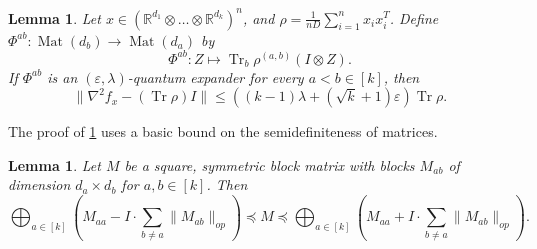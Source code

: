 \documentclass[aos]{imsart}
\newtheorem{lemma}[theorem]{Lemma}
\theoremstyle{definition}
\numberwithin{equation}{section}
\DeclareMathOperator{\mat}{Mat}
\DeclareMathOperator{\tr}{Tr}
\newcommand{\R}{{\mathbb{R}}}
\newcommand{\ot}{\otimes}
\newcommand{\eps}{\varepsilon}
\newcommand{\samp}{x}
\begin{document}
\begin{lemma}\label{lem:expansion-convexity} Let $\samp \in (\R^{d_1} \ot \dots \ot \R^{d_k})^n$, and $\rho = \frac{1}{nD} \sum_{i = 1}^n \samp_i \samp_i^T$. Define $\Phi^{ab}:\mat (d_b) \to \mat(d_a)$ by 
$$ \Phi^{ab}: Z \mapsto \tr_b \rho^{(a,b)} \left(I \ot Z\right).$$
If $\Phi^{ab}$ is an $(\eps, \lambda)$-quantum expander for every $a < b \in [k]$, then 
$$ \|\nabla^2 f_\samp - (\tr \rho) I\| \leq ((k-1)\lambda + (\sqrt{k} + 1) \eps)\tr \rho.$$
\end{lemma}
The proof of \cref{lem:expansion-convexity} uses a basic bound on the semidefiniteness of matrices.
\begin{lemma}\label{lem:block-matrix}
Let $M$ be a square, symmetric block matrix with blocks $M_{ab}$ of dimension $d_a \times d_b$ for $a,b \in [k]$. Then 
$$ \bigoplus_{a \in [k]} \left(M_{aa} - I \cdot \sum_{b \neq a} \|M_{ab}\|_{op}\right) \preceq M \preceq \bigoplus_{a \in [k]} \left(M_{aa} + I \cdot \sum_{b \neq a} \|M_{ab}\|_{op}\right) .$$
\end{lemma}
\end{document}
